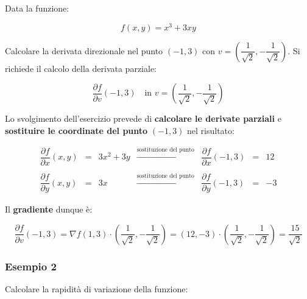\documentclass[a4paper]{article}
\begin{document}
	Data la funzione:
	
	\begin{equation*}
		f\left(x,y\right) = x^{3} + 3xy
	\end{equation*}

	\noindent
	Calcolare la derivata direzionale nel punto $\left(-1,3\right)$ con $v = \left(\dfrac{1}{\sqrt{2}}, -\dfrac{1}{\sqrt{2}}\right)$. Si richiede il calcolo della derivata parziale:
	
	\begin{equation*}
		\dfrac{\partial f}{\partial v}\left(-1,3\right) \hspace{1em} \text{in } v = \left(\dfrac{1}{\sqrt{2}}, -\dfrac{1}{\sqrt{2}}\right)
	\end{equation*}

	\noindent
	Lo svolgimento dell'esercizio prevede di \textbf{calcolare le derivate parziali} e \textbf{sostituire le coordinate del punto} $\left(-1,3\right)$ nel risultato:
	
	\begin{equation*}
		\begin{array}{lllllll}
			\dfrac{\partial f}{\partial x}\left(x,y\right) & = & 3x^{2} + 3y & \xrightarrow{\text{sostituzione del punto}} & \dfrac{\partial f}{\partial x}\left(-1,3\right) & = & 12 \\
			&&&&&& \\
			\dfrac{\partial f}{\partial y}\left(x,y\right) & = & 3x 		 & \xrightarrow{\text{sostituzione del punto}} & \dfrac{\partial f}{\partial y}\left(-1,3\right) & = & -3
		\end{array}
	\end{equation*}

	Il \textbf{gradiente} dunque è:
	
	\begin{equation*}
		\dfrac{\partial f}{\partial v}\left(-1,3\right) = \nabla f\left(1,3\right) \cdot \left(\dfrac{1}{\sqrt{2}}, -\dfrac{1}{\sqrt{2}}\right) = \left(12, -3\right) \cdot \left(\dfrac{1}{\sqrt{2}}, -\dfrac{1}{\sqrt{2}}\right) = \dfrac{15}{\sqrt{2}}
	\end{equation*}

	\newpage

	\subsubsection[Esempio 2]{\textcolor{Green4}{Esempio 2}}
	
	Calcolare la rapidità di variazione della funzione:
	
\end{document}
